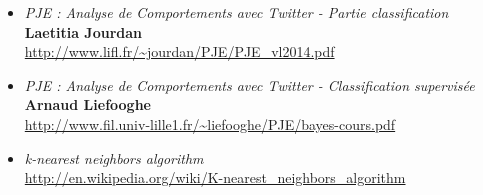 \documentclass[pdftex,12pt,a4paper]{report}
\begin{document}
\begin{spacing}{1.2}
\begin{itemize}
\item{\textit{PJE : Analyse de Comportements avec Twitter - Partie classification} \\ \textbf{Laetitia Jourdan} \\ \url{http://www.lifl.fr/~jourdan/PJE/PJE_vl2014.pdf}}
\item{\textit{PJE : Analyse de Comportements avec Twitter - Classification supervisée} \\ \textbf{Arnaud Liefooghe} \\ \url{http://www.fil.univ-lille1.fr/~liefooghe/PJE/bayes-cours.pdf}}
\item{\textit{k-nearest neighbors algorithm} \\ \url{http://en.wikipedia.org/wiki/K-nearest_neighbors_algorithm}}

\end{itemize}

\end{spacing}
\end{document}
